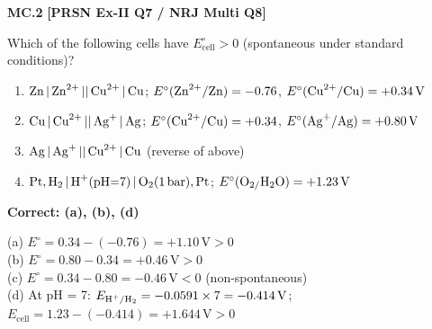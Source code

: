 \begin{problembox}
\textbf{MC.2} \hfill \textbf{[PRSN Ex-II Q7 / NRJ Multi Q8]}

Which of the following cells have $E^\circ_{\text{cell}} > 0$ (spontaneous under standard conditions)?
\begin{enumerate}[label=(\alph*)]
    \item $\ce{Zn | Zn^2+ || Cu^2+ | Cu}$; $E^\circ(\ce{Zn^2+/Zn})=-0.76$, $E^\circ(\ce{Cu^2+/Cu})=+0.34\,\text{V}$
    \item $\ce{Cu | Cu^2+ || Ag+ | Ag}$; $E^\circ(\ce{Cu^2+/Cu})=+0.34$, $E^\circ(\ce{Ag+/Ag})=+0.80\,\text{V}$
    \item $\ce{Ag | Ag+ || Cu^2+ | Cu}$ (reverse of above)
    \item $\ce{Pt, H2 | H+(pH=7) | O2(1 bar), Pt}$; $E^\circ(\ce{O2/H2O})=+1.23\,\text{V}$
\end{enumerate}
\end{problembox}
\begin{solution}
\textbf{Correct: (a), (b), (d)}

(a) $E^\circ = 0.34 - (-0.76) = +1.10\,\text{V} > 0$ \checkmark\\
(b) $E^\circ = 0.80 - 0.34 = +0.46\,\text{V} > 0$ \checkmark\\
(c) $E^\circ = 0.34 - 0.80 = -0.46\,\text{V} < 0$ (non-spontaneous) \texttimes\\
(d) At pH = 7: $E_{\ce{H+/H2}} = -0.0591\times7 = -0.414\,\text{V}$; $E_{\text{cell}} = 1.23 - (-0.414) = +1.644\,\text{V} > 0$ \checkmark
\end{solution}


